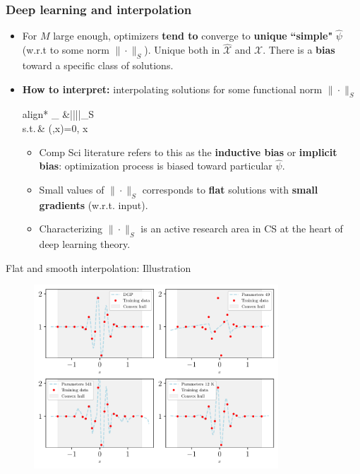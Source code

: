 \documentclass[aspectratio=169,10pt]{beamer}
\newcommand{\emphcolor}[1]{\textbf{\textcolor{emphcolorval}{#1}}}
\newcommand{\Xdom}{\mathcal{X}}
\newcommand{\Xtrain}{\hat{\mathcal{X}}}
\newcommand{\st}{\textrm{s.t.}\,}
\begin{document}
\begin{frame}
	\frametitle{Deep learning and interpolation}\label{implicit}
	\begin{itemize}
		\item For $M$ large enough, optimizers \emphcolor{tend to} converge to \emphcolor{unique} \emphcolor{``simple"}  $\hat{\psi}$ (w.r.t to some norm $\|\cdot\|_S$). Unique both in $\Xtrain$ and $\Xdom$. There is a \emphcolor{bias} toward a specific class of solutions.
		\medskip
		\item \emphcolor{How to interpret:} interpolating solutions for some functional norm $\|\cdot\|_S$
		\begin{empheq}[box=\tcbhighmath]{align*}
			\min_{\hat{\psi}\in {}} &||\hat{\psi}||_S\\
			\st & \ell(\hat{\psi},x)=0,\quad {} x \in \Xtrain
		\end{empheq}
		\vspace{-0.1in}
		
		\begin{itemize}
			\item Comp Sci literature refers to this as the \emphcolor{inductive bias} or \emphcolor{implicit bias}: optimization process is biased toward particular $\hat{\psi}$.\smallskip
			\item Small values of $\|\cdot\|_S$ corresponds to \emphcolor{flat} solutions with \emphcolor{small gradients} (w.r.t. input).
			\smallskip
			\item Characterizing $\|\cdot\|_S$  is an active research area in CS at the heart of deep learning theory.
		\end{itemize}
	\end{itemize}
\hyperlink{sobolev}{}
\end{frame}


\begin{frame}{Flat and smooth interpolation:  Illustration}
	\begin{figure}[h!]
		\begin{center}
			\includegraphics[height=2.7in]{./figures/fourplots_example_reg.pdf}
		\end{center}
	\end{figure}

\end{frame}
\end{document}
